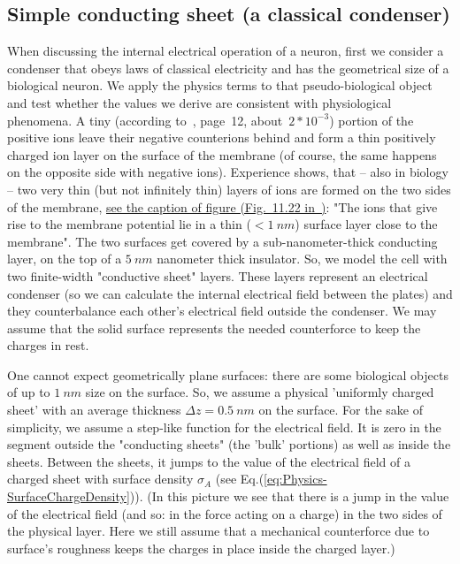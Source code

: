 \subsection[Classical condenser]{Simple conducting sheet (a classical condenser)\label{sec:Physics-SimpleSheet}}

When discussing the internal electrical operation of a neuron, first we consider a condenser that obeys 
laws of classical electricity and has 
the geometrical size of a biological neuron.
We apply the physics terms to that pseudo-biological object
and test whether the values we derive are consistent with physiological phenomena. A tiny (according to~\cite{JohnstonWuNeurophysiology:1995}, page~12, about~$2*10^{-3}$) portion of the positive ions leave their negative
counterions behind and form a thin positively charged ion layer on the surface of the membrane (of course, the same happens on the opposite side with negative ions). Experience shows, that -- also in biology -- two very thin (but not infinitely thin) layers of ions are formed on the two sides of the membrane, \href{https://www.ncbi.nlm.nih.gov/books/NBK26910/figure/A2034/?report=objectonly}{see the caption of figure (Fig.~11.22 in~\cite{MolecularBiology:2002})}:
"The ions that give rise to the membrane potential lie
in a thin ($< 1\ nm$) surface layer close to the membrane".
The two surfaces get covered by a sub-nanometer-thick
conducting layer, on the top of a $5~nm$ nanometer thick insulator. 
So, we model the cell with two finite-width "conductive sheet" layers.
These layers represent an electrical condenser (so we can calculate the internal electrical field between the plates) and they counterbalance each other's electrical field outside the condenser.
We may assume that the solid surface represents the needed
counterforce to keep the charges in rest.

One cannot expect geometrically plane surfaces: there are 
some biological objects of up to $1~nm$ size on the surface. So, we assume
a physical 'uniformly charged sheet' with an average thickness $\Delta z=0.5~nm$ on the surface.
For the sake of simplicity, we assume a step-like function
for the electrical field. It is zero in the segment outside 
the "conducting sheets" (the 'bulk' portions) as well as inside the sheets.  Between the sheets, it jumps to the value of the electrical field of a charged sheet with surface density $\sigma_A$ (see Eq.(\ref{eq:Physics-SurfaceChargeDensity})).
(In this picture we see that there is a jump in the value of the electrical field (and so: in the force acting on a charge)
in the two sides of the physical layer. Here we still assume that a mechanical counterforce due to surface's roughness keeps the charges in place inside the charged layer.)

